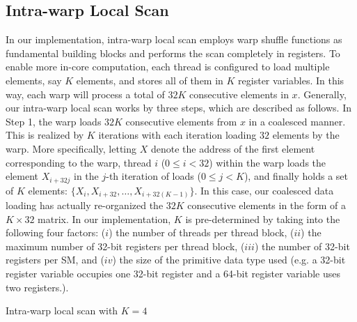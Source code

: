 \documentclass[article]{elsarticle}
\renewcommand{\hl}[1]{#1}
\begin{document}
{\begin{algorithm}[!h]
\begin{algorithmic}[1]
        
        
        
    \EndFor
\EndProcedure
\end{algorithmic}
\end{algorithm}
\subsection{Intra-warp Local Scan} 
In our implementation, intra-warp local scan employs warp shuffle functions as fundamental building blocks and performs the scan completely in registers. To enable more in-core computation, each thread is configured to load multiple elements, say $K$ elements, and stores all of them in $K$ register variables. In this way, each warp will process a total of $32K$ consecutive elements in $x$. Generally, our intra-warp local scan works \hl{by three steps, which are described as follows. In Step 1,} the warp loads $32K$ consecutive elements from $x$ in a coalesced manner. This is realized by $K$ iterations with each iteration loading $32$ elements by the warp. More specifically, letting $X$ denote the address of the first element corresponding to the warp, thread $i$ (\mbox{$0\leq i <32$}) within the warp loads the element $X_{i + 32j}$ in the $j$-th iteration of loads ($0\leq j < K$), and finally holds a set of $K$ elements: $\{X_{i}, X_{i + 32}, \ldots, X_{i + 32(K-1)}\}$. In this case, our coalesced data loading has actually re-organized the $32K$ consecutive elements in the form of a $K\times 32$ matrix. In our implementation, $K$ is pre-determined by taking into the following four factors: ($i$) the number of threads per thread block, ($ii$) the maximum number of 32-bit registers per thread block, ($iii$) the number of 32-bit registers per SM, and ($iv$) the size of the primitive data type used (e.g. a 32-bit register variable occupies one 32-bit register and a 64-bit register variable uses two registers.).
\begin{algorithm}[!h]
\caption{Intra-warp local scan with \mbox{$K=4$}}
\label{alg:warp_local_scan}
\begin{algorithmic}[1]
\fontsize{8pt}{8.05pt}\selectfont
{}


\end{algorithmic}
\end{algorithm}}
\end{document}
